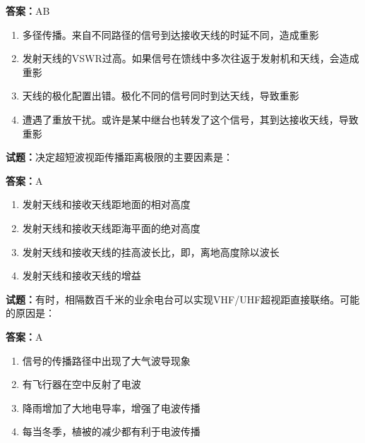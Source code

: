 \documentclass{ctexbook}
\begin{document}
\textbf{答案：}AB 

\begin{enumerate}[leftmargin=3em]
  \item 多径传播。来自不同路径的信号到达接收天线的时延不同，造成重影 

  \item 发射天线的VSWR过高。如果信号在馈线中多次往返于发射机和天线，会造成重影 

  \item 天线的极化配置出错。极化不同的信号同时到达天线，导致重影 

  \item 遭遇了重放干扰。或许是某中继台也转发了这个信号，其到达接收天线，导致重影 

\end{enumerate}





\vspace{1em}

\textbf{试题：}决定超短波视距传播距离极限的主要因素是： 

\textbf{答案：}A 

\begin{enumerate}[leftmargin=3em]
  \item 发射天线和接收天线距地面的相对高度 

  \item 发射天线和接收天线距海平面的绝对高度 

  \item 发射天线和接收天线的挂高波长比，即，离地高度除以波长 

  \item 发射天线和接收天线的增益 

\end{enumerate}






\vspace{1em}

\textbf{试题：}有时，相隔数百千米的业余电台可以实现VHF/UHF超视距直接联络。可能的原因是： 

\textbf{答案：}A 

\begin{enumerate}[leftmargin=3em]
  \item 信号的传播路径中出现了大气波导现象 

  \item 有飞行器在空中反射了电波 

  \item 降雨增加了大地电导率，增强了电波传播 

  \item 每当冬季，植被的减少都有利于电波传播 

\end{enumerate}
\end{document}
